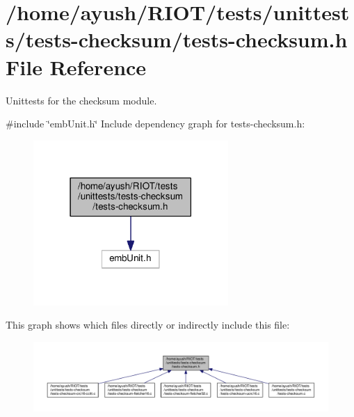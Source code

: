 \hypertarget{tests-checksum_8h}{}\section{/home/ayush/\+R\+I\+O\+T/tests/unittests/tests-\/checksum/tests-\/checksum.h File Reference}
\label{tests-checksum_8h}


Unittests for the {\ttfamily checksum} module.  


{\ttfamily \#include \char`\"{}emb\+Unit.\+h\char`\"{}}\newline
Include dependency graph for tests-\/checksum.h\+:
\nopagebreak
\begin{figure}[H]
\begin{center}
\leavevmode
\includegraphics[width=210pt]{tests-checksum_8h__incl}
\end{center}
\end{figure}
This graph shows which files directly or indirectly include this file\+:
\nopagebreak
\begin{figure}[H]
\begin{center}
\leavevmode
\includegraphics[width=350pt]{tests-checksum_8h__dep__incl}
\end{center}
\end{figure}
